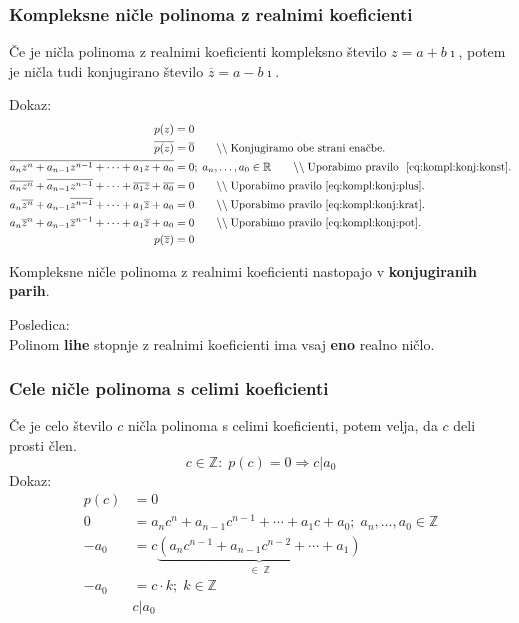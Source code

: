 \documentclass[a4paper,oneside,12pt,fleqn]{article}
\def\R{\ensuremath{\mathbb R}}
\def\Z{\ensuremath{\mathbb Z}}
\newcommand\krat\cdot
\newcommand{\comment}[1]{\ensuremath{\qquad\backslash\backslash\;}\textnormal{#1}}
\newcommand{\ii}{\ensuremath{\imath}}
\def\konj{\overline} %
\renewcommand\implies\Rightarrow
\numberwithin{equation}{section}
\begin{document}
\subsubsection{Kompleksne ničle polinoma z realnimi koeficienti}
\label{sec:pol:nic:kompl}
Če je ničla polinoma z realnimi koeficienti kompleksno število $z=a+b\ii$, potem je ničla
tudi konjugirano število $\konj{z} = a-b\ii$.

Dokaz:
\begin{align*}
  p(z) &= 0 \\
  \konj{p(z)} &= \konj{0} \comment{Konjugiramo obe strani enačbe.} \\
  \konj{a_nz^n+a_{n-1}z^{n-1}+\cdots+a_1z+a_0} &= 0; \; a_n,\ldots,a_0 \in \R \comment{Uporabimo pravilo~
  \eqref{eq:kompl:konj:konst}.} \\
  \konj{a_nz^n}+\konj{a_{n-1}z^{n-1}}+\cdots+\konj{a_1z}+\konj{a_0} &= 0
  \comment{Uporabimo pravilo~\eqref{eq:kompl:konj:plus}.} \\
  a_n\konj{z^n}+a_{n-1}\konj{z^{n-1}}+\cdots+a_1\konj{z}+a_0 &= 0 \comment{Uporabimo
  pravilo~\eqref{eq:kompl:konj:krat}.} \\
  a_n\konj{z}^n+a_{n-1}\konj{z}^{n-1}+\cdots+a_1\konj{z}+a_0 &= 0 \comment{Uporabimo
  pravilo~\eqref{eq:kompl:konj:pot}.}\\
  p(\konj{z}) &= 0
\end{align*}

Kompleksne ničle polinoma z realnimi koeficienti nastopajo v \textbf{konjugiranih parih}.

Posledica: \\
Polinom \textbf{lihe} stopnje z realnimi koeficienti ima vsaj \textbf{eno} realno ničlo.

\subsubsection{Cele ničle polinoma s celimi koeficienti}
\label{sec:pol:nic:cel}
Če je celo število $c$ ničla polinoma s celimi koeficienti, potem velja, da $c$ deli
prosti člen.
\[ c \in \Z\!:\;p(c) = 0 \implies c|a_0 \]
Dokaz:
\begin{align*}
  p(c) &= 0 \\
  0 &= a_nc^n+a_{n-1}c^{n-1}+\cdots+a_1c+a_0; \; a_n,\ldots,a_0 \in \Z \\
  -a_0 &= c\underbrace{\left(a_nc^{n-1} + a_{n-1}c^{n-2} +\cdots+a_1\right)}_{\in\;\Z} \\
  -a_0 &= c \krat k; \; k \in \Z \\
  &c | a_0 \\
\end{align*}
\end{document}
